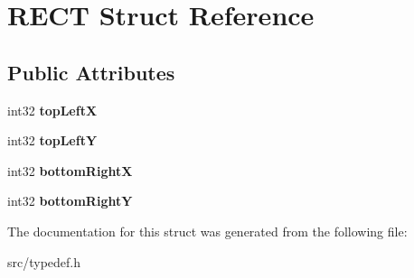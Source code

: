 \hypertarget{struct_r_e_c_t}{}\section{R\+E\+C\+T Struct Reference}
\label{struct_r_e_c_t}
\subsection*{Public Attributes}
\begin{DoxyCompactItemize}
\item 
\hypertarget{struct_r_e_c_t_a6059ab46d0d74e86bc7ea0fbbc15b638}{}int32 {\bfseries top\+Left\+X}\label{struct_r_e_c_t_a6059ab46d0d74e86bc7ea0fbbc15b638}

\item 
\hypertarget{struct_r_e_c_t_aff140cc9ec03e1d50b4a7830d6daf9d4}{}int32 {\bfseries top\+Left\+Y}\label{struct_r_e_c_t_aff140cc9ec03e1d50b4a7830d6daf9d4}

\item 
\hypertarget{struct_r_e_c_t_a7bd631ce0c5f88976fbd92a851e3875a}{}int32 {\bfseries bottom\+Right\+X}\label{struct_r_e_c_t_a7bd631ce0c5f88976fbd92a851e3875a}

\item 
\hypertarget{struct_r_e_c_t_a65fdbc804ec1d2a7274c9762bcf94192}{}int32 {\bfseries bottom\+Right\+Y}\label{struct_r_e_c_t_a65fdbc804ec1d2a7274c9762bcf94192}

\end{DoxyCompactItemize}


The documentation for this struct was generated from the following file\+:\begin{DoxyCompactItemize}
\item 
src/typedef.\+h\end{DoxyCompactItemize}
